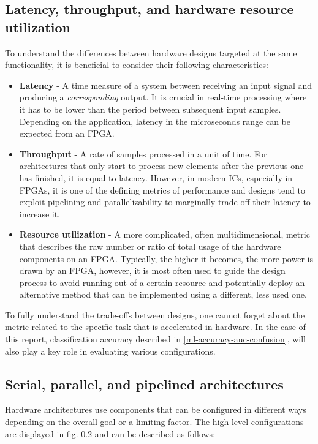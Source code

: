 \subsection{Latency, throughput, and hardware resource utilization}
To understand the differences between hardware designs targeted at the same functionality, it is beneficial to consider their following characteristics:

\begin{itemize}
  \item \textbf{Latency} - A time measure of a system between receiving an input signal and producing a \textit{corresponding} output. It is crucial in real-time processing where it has to be lower than the period between subsequent input samples. Depending on the application, latency in the microseconds range can be expected from an FPGA.
  \item \textbf{Throughput} - A rate of samples processed in a unit of time. For architectures that only start to process new elements after the previous one has finished, it is equal to latency. However, in modern ICs, especially in FPGAs, it is one of the defining metrics of performance and designs tend to exploit pipelining and parallelizability to marginally trade off their latency to increase it.
  \item \textbf{Resource utilization} - A more complicated, often multidimensional, metric that describes the raw number or ratio of total usage of the hardware components on an FPGA. Typically, the higher it becomes, the more power is drawn by an FPGA, however, it is most often used to guide the design process to avoid running out of a certain resource and potentially deploy an alternative method that can be implemented using a different, less used one.
\end{itemize}

To fully understand the trade-offs between designs, one cannot forget about the metric related to the specific task that is accelerated in hardware. In the case of this report, classification accuracy described in \autoref{ml-accuracy-auc-confusion}, will also play a key role in evaluating various configurations.


\subsection{Serial, parallel, and pipelined architectures}
Hardware architectures use components that can be configured in different ways depending on the overall goal or a limiting factor. The high-level configurations  are displayed in fig. \ref{} and can be described as follows:


